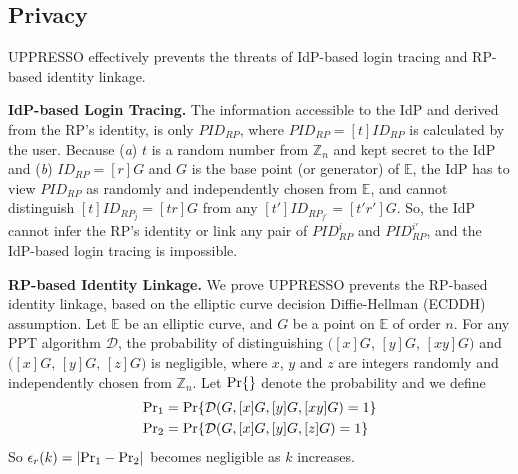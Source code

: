 


\subsection{Privacy}
UPPRESSO effectively prevents the threats of IdP-based login tracing and RP-based identity linkage.

\vspace{0.8mm}
\noindent\textbf{IdP-based Login Tracing.}
The information accessible to the IdP and derived from the RP's identity,
    is only $PID_{RP}$, where $PID_{RP} = [t]ID_{RP}$ is calculated by the user.
Because  (\emph{a}) $t$ is a random number from $\mathbb{Z}_n$ and kept secret to the IdP
 and (\emph{b}) $ID_{RP} = [r]G$ and $G$ is the base point (or generator) of $\mathbb{E}$,
 the IdP has to view $PID_{RP}$ as randomly and independently chosen from $\mathbb{E}$,
    and cannot distinguish $[t]ID_{RP_j} = [tr]G$ from any $[t']ID_{RP_{j'}} = [t'r']G$.
So, the IdP cannot infer the RP's identity or link any pair of $PID_{RP}^i$ and $PID_{RP}^{i'}$,
    and the IdP-based login tracing is impossible.

\vspace{0.8mm}
\noindent\textbf{RP-based Identity Linkage.}
We prove UPPRESSO prevents the RP-based identity linkage,
 based on the elliptic curve decision Diffie-Hellman (ECDDH) assumption. %
%
Let $\mathbb{E}$ be an elliptic curve,
    and $G$ be a point on $\mathbb{E}$ of order $n$.
For any PPT algorithm $\mathcal{D}$, the probability of distinguishing
 $([x]G$, $[y]G$, $[xy]G)$ and $([x]G$, $[y]G$, $[z]G)$
is negligible,
 where $x$, $y$ and $z$ are integers randomly and independently chosen from $\mathbb{Z}_n$.
Let  ${\rm Pr}\{\}$ denote the probability and
 we define
\begin{align*}
&{\rm Pr}_1 =  {\rm Pr}\{\mathcal{D}(G, [x]G, [y]G, [xy]G)=1\} \\
&{\rm Pr}_2 =  {\rm Pr}\{\mathcal{D}(G, [x]G, [y]G, [z]G)=1\}
\end{align*}
So $\epsilon_{r}(k) = |{\rm Pr}_1 - {\rm Pr}_2|$ becomes negligible as $k$ increases.


